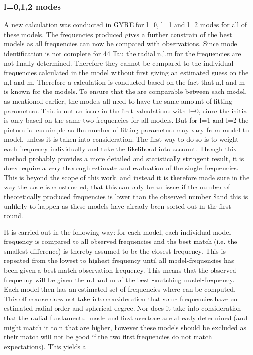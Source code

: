 \subsubsection{l=0,1,2 modes}
A new calculation was conducted in GYRE for l=0, l=1 and l=2 modes for all of these models. The frequencies produced gives a further constrain of the best models as all frequencies can now be compared with observations. Since mode identification is not complete for 44 Tau the radial n,l,m for the frequencies are not finally determined. Therefore they cannot be compared to the individual frequencies calculated in the model without first giving an estimated guess on the n,l and m. Therefore a calculation is conducted based on the fact that n,l and m is known for the models. To ensure that the \chis are comparable between each model, as mentioned earlier, the models all need to have the same amount of fitting parameters. This is not an issue in the first \chis calculations with l=0, since the initial \chis is only based on the same two frequencies for all models. But for l=1 and l=2 the picture is less simple as the number of fitting parameters may vary from model to model, unless it is taken into consideration. The first way to do so is to weight each frequency individually and take the likelihood into account. Though this method probably provides a more detailed and statistically stringent result, it is does require a  very thorough estimate and evaluation of the single frequencies. This is beyond the scope of this work, and instead it is therefore made sure in the way the code is constructed, that this can only be an issue if the number of theoretically produced frequencies is lower than the observed number 8and this is unlikely to happen as these models have already been sorted out in the first \chis round. 

It is carried out in the following way: for each model, each individual model-frequency is compared to all observed frequencies and the best match (i.e. the smallest difference) is thereby assumed to be the closest frequency. This is repeated from the lowest to highest frequency until all model-frequencies has been given a best match observation frequency. This means that the observed frequency will be given the n.l and m of the best -matching model-frequency. Each model then has an estimated set of frequencies where \chis can be computed. This off course does not take into consideration that some frequencies have an estimated radial order and spherical degree. Nor does it take into consideration that the radial fundamental mode and first overtone are already determined (and might match it to n that are higher, however these models should be excluded as their match will not be good if the two first frequencies do not match expectations). This yields a \chis 

